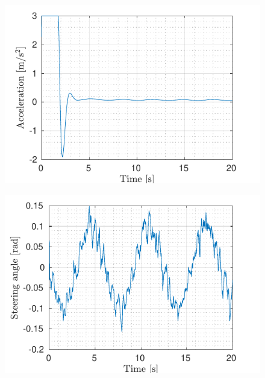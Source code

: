 \begin{figure}[!h]
\begin{minipage}[t]{0.49\textwidth}
		\includegraphics[width=\textwidth]{../../MATLAB/lane_following/figure/AccelerationVsTime.pdf}
		\label{fig:acceleration_laneFollowing}
	\end{minipage}
	\begin{minipage}[t]{0.49\textwidth}
		\includegraphics[width=\textwidth]{../../MATLAB/lane_following/figure/SteeringAngleVsTime.pdf}
		\label{fig:steering_laneFollowing}
	\end{minipage}
	\begin{minipage}[t]{0.49\textwidth}

\end{minipage}
\end{figure}
